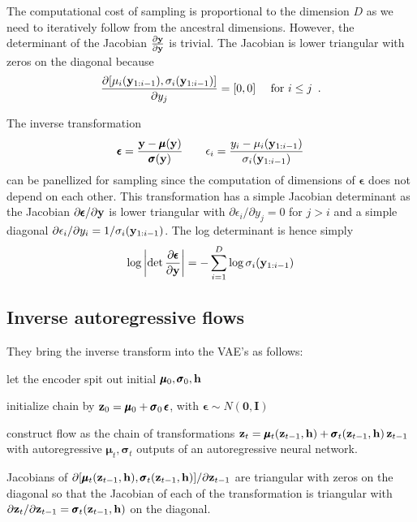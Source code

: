 The computational cost of sampling is proportional to the dimension $D$ as we need to iteratively follow from the ancestral dimensions.
However, the determinant of the Jacobian $\frac{\partial \mathbf{y}}{\partial \mathbf{y}}$ is trivial. The Jacobian is lower triangular with zeros on the diagonal because
\begin{equation}\label{eqiaf:autoregressJacob}
\frac{\partial [\mu_i(\mathbf{y}_{1:i-1}), \sigma_i(\mathbf{y}_{1:i-1})]}{\partial y_j} = [0, 0] \quad \text{ for } i \leq j \enspace .
\end{equation}


The inverse transformation
\begin{equation}
\pmb{\epsilon} = \frac{\mathbf{y} - \pmb{\mu}(\mathbf{y})}{\pmb{\sigma}(\mathbf{y})}
\qquad 
\epsilon_i = \frac{y_i - \mu_i(\mathbf{y}_{1:i-1})}{\sigma_i(\mathbf{y}_{1:i-1})}
\end{equation}
can be panellized for sampling since the computation of dimensions of $\pmb{\epsilon}$ does not depend on each other.
This transformation has a simple Jacobian determinant as the Jacobian $\partial \pmb{\epsilon} / \partial \mathbf{y}$ is lower triangular with $\partial \epsilon_i / \partial y_j = 0$ for $j > i$ and a simple diagonal $\partial \epsilon_i / \partial y_i = 1 / \sigma_i(\mathbf{y}_{1:i-1})$.
The log determinant is hence simply
\begin{equation}
\log \left\lvert \det \frac{\partial \pmb{\epsilon}}{\partial \mathbf{y}} \right\rvert = - \sum_{i=1}^D \log \sigma_i(\mathbf{y}_{1:i-1})
\end{equation}

\subsection{Inverse autoregressive flows}

They bring the inverse transform into the VAE's as follows:
\begin{compactitem}
\item let the encoder spit out initial $\pmb{\mu}_0, \pmb{\sigma}_0, \mathbf{h}$
\item initialize chain by $\mathbf{z}_0 = \pmb{\mu}_0 + \pmb{\sigma}_0 \, \pmb{\epsilon}$, with $\pmb{\epsilon} \sim N(\mathbf{0}, \mathbf{I})$
\item construct flow as the chain of transformations $\mathbf{z}_t = \pmb{\mu}_t(\mathbf{z}_{t-1}, \mathbf{h}) + \pmb{\sigma}_t(\mathbf{z}_{t-1}, \mathbf{h}) \, \mathbf{z}_{t-1}$ with autoregressive $\pmb{\mu}_t, \pmb{\sigma}_t$ outputs of an autoregressive neural network.  
\end{compactitem}
Jacobians of $\partial [\pmb{\mu}_t(\mathbf{z}_{t-1}, \mathbf{h}), \pmb{\sigma}_t(\mathbf{z}_{t-1}, \mathbf{h})] / \partial \mathbf{z}_{t-1}$ are triangular with zeros on the diagonal so that the Jacobian of each of the transformation is triangular with $\partial \mathbf{z}_t / \partial \mathbf{z}_{t-1} = \pmb{\sigma}_t(\mathbf{z}_{t-1}, \mathbf{h})$ on the diagonal.

